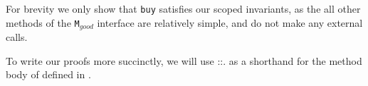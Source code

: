  
For brevity we only show that \verb|buy| satisfies our scoped invariants, as the all other methods of 
the \verb|M|$_{good}$ interface are relatively simple, and do not make any external calls. 

{ To write our proofs more succinctly, we will use ::. as a shorthand for the method body of  defined in .}

  

